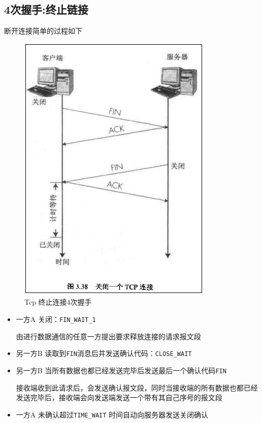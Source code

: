 \documentclass[UTF8,a4paper,8pt]{ctexbook}
\begin{document}
		\subsection{4次握手:终止链接}
			断开连接简单的过程如下
			\begin{figure}[ht]
				\centering
				\includegraphics[scale = 0.7]{Tcp-close.png}
				\caption{Tcp 终止连接4次握手}
				\label{tcpClose}
			\end{figure}
			
			\begin{itemize}
				\item 一方A 关闭：\verb|FIN_WAIT_1|
				
					由进行数据通信的任意一方提出要求释放连接的请求报文段
					
				\item 另一方B 读取到\verb|FIN|消息后并发送确认代码：\verb|CLOSE_WAIT|
				
				\item 另一方B 当所有数据也都已经发送完毕后发送最后一个确认代码\verb|FIN|
				
					接收端收到此请求后，会发送确认报文段，同时当接收端的所有数据也都已经发送完毕后，接收端会向发送端发送一个带有其自己序号的报文段
					
				\item 一方A 未确认超过\verb|TIME_WAIT| 时间自动向服务器发送关闭确认
			\end{itemize}
		
\end{document}
